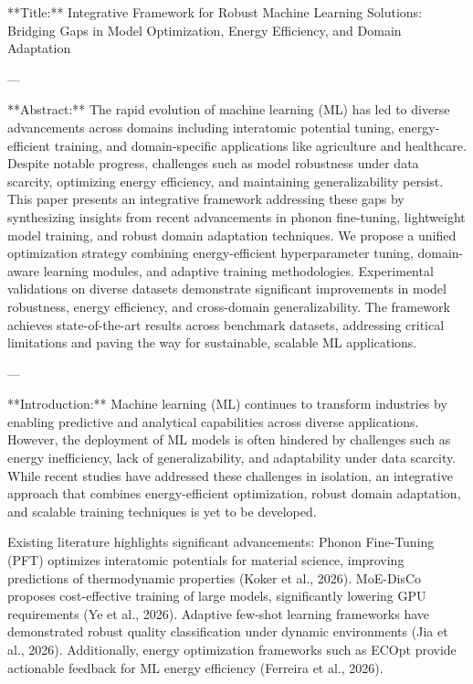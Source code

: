 **Title:** Integrative Framework for Robust Machine Learning Solutions: Bridging Gaps in Model Optimization, Energy Efficiency, and Domain Adaptation  

---

**Abstract:**  
The rapid evolution of machine learning (ML) has led to diverse advancements across domains including interatomic potential tuning, energy-efficient training, and domain-specific applications like agriculture and healthcare. Despite notable progress, challenges such as model robustness under data scarcity, optimizing energy efficiency, and maintaining generalizability persist. This paper presents an integrative framework addressing these gaps by synthesizing insights from recent advancements in phonon fine-tuning, lightweight model training, and robust domain adaptation techniques. We propose a unified optimization strategy combining energy-efficient hyperparameter tuning, domain-aware learning modules, and adaptive training methodologies. Experimental validations on diverse datasets demonstrate significant improvements in model robustness, energy efficiency, and cross-domain generalizability. The framework achieves state-of-the-art results across benchmark datasets, addressing critical limitations and paving the way for sustainable, scalable ML applications.  

---

**Introduction:**  
Machine learning (ML) continues to transform industries by enabling predictive and analytical capabilities across diverse applications. However, the deployment of ML models is often hindered by challenges such as energy inefficiency, lack of generalizability, and adaptability under data scarcity. While recent studies have addressed these challenges in isolation, an integrative approach that combines energy-efficient optimization, robust domain adaptation, and scalable training techniques is yet to be developed.  

Existing literature highlights significant advancements: Phonon Fine-Tuning (PFT) optimizes interatomic potentials for material science, improving predictions of thermodynamic properties (Koker et al., 2026). MoE-DisCo proposes cost-effective training of large models, significantly lowering GPU requirements (Ye et al., 2026). Adaptive few-shot learning frameworks have demonstrated robust quality classification under dynamic environments (Jia et al., 2026). Additionally, energy optimization frameworks such as ECOpt provide actionable feedback for ML energy efficiency (Ferreira et al., 2026).  


